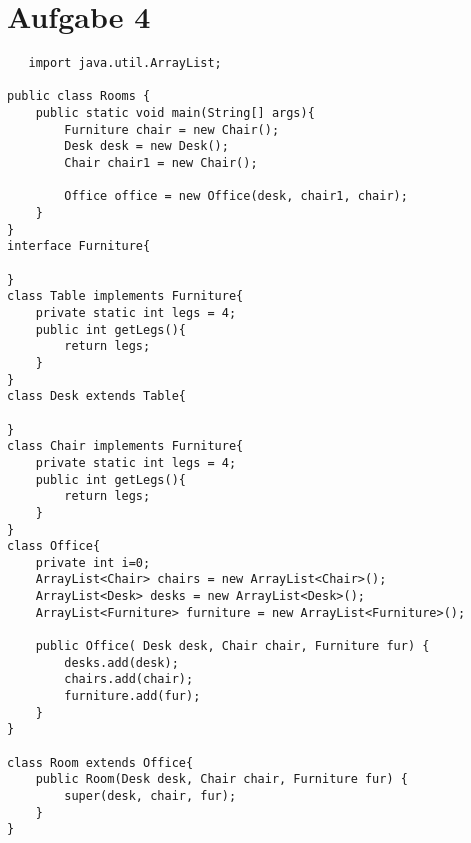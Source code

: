 \documentclass[12pt,a4paper,oneside,ngerman]{article}
\begin{document}
\section{Aufgabe 4}
\begin{lstlisting}
   import java.util.ArrayList;

public class Rooms {
    public static void main(String[] args){
        Furniture chair = new Chair();
        Desk desk = new Desk();
        Chair chair1 = new Chair();

        Office office = new Office(desk, chair1, chair);
    }
}
interface Furniture{

}
class Table implements Furniture{
    private static int legs = 4;
    public int getLegs(){
        return legs;
    }
}
class Desk extends Table{

}
class Chair implements Furniture{
    private static int legs = 4;
    public int getLegs(){
        return legs;
    }
}
class Office{
    private int i=0;
    ArrayList<Chair> chairs = new ArrayList<Chair>();
    ArrayList<Desk> desks = new ArrayList<Desk>();
    ArrayList<Furniture> furniture = new ArrayList<Furniture>();

    public Office( Desk desk, Chair chair, Furniture fur) {
        desks.add(desk);
        chairs.add(chair);
        furniture.add(fur);
    }
}

class Room extends Office{
    public Room(Desk desk, Chair chair, Furniture fur) {
        super(desk, chair, fur);
    }
}
\end{lstlisting}
\end{document}
